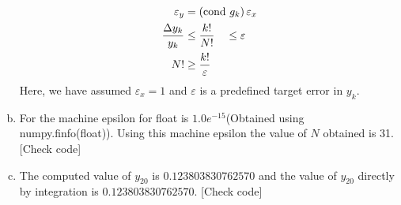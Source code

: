 \begin{enumerate}[(a)]
\begin{align*}
				\varepsilon_y &= \left({\mathrm{cond} \ g_k}\right) \varepsilon_x \\
				\frac{\Delta y_k}{y_k} &\leq \frac{k!}{N!} \quad \leq \varepsilon\\
				N! &\geq \frac{k!}{\varepsilon}
			\end{align*}
			Here, we have assumed $\varepsilon_x = 1$ and $\varepsilon$ is a predefined target error in $y_k$.
	\item For  the machine epsilon for float is $1.0e^{-15}$(Obtained using numpy.finfo(float)). Using this machine epsilon the value of $N$ obtained is 31. [Check code]
	\item The computed value of $y_{20}$ is $0.123803830762570$ and the value of $y_{20}$ directly by integration is $0.123803830762570$. [Check code]
\end{enumerate}
